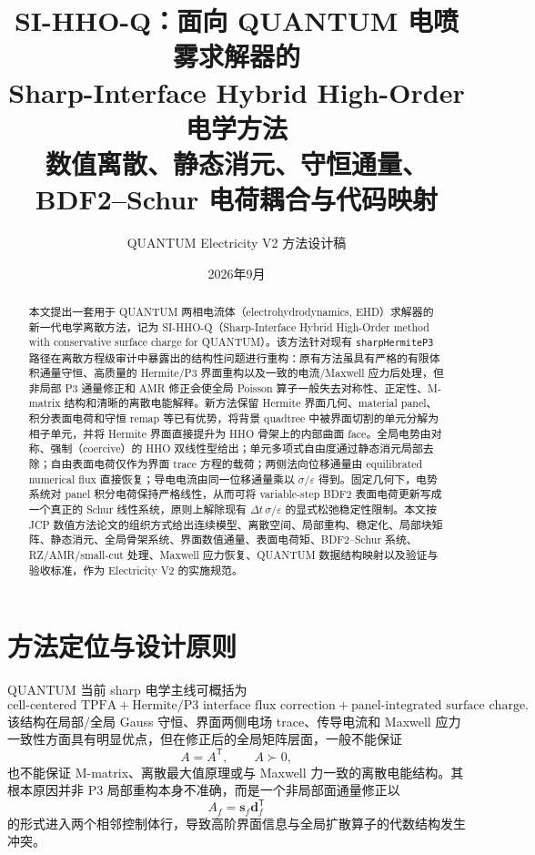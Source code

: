 \documentclass[UTF8,a4paper,11pt]{ctexart}
\title{\bfseries SI-HHO-Q：面向 QUANTUM 电喷雾求解器的\\Sharp-Interface Hybrid High-Order 电学方法\\\large 数值离散、静态消元、守恒通量、BDF2--Schur 电荷耦合与代码映射}
\author{QUANTUM Electricity V2 方法设计稿}
\date{2026年9月}
\newcommand{\eps}{\varepsilon}
\newcommand{\vct}[1]{\bm{#1}}
\newcommand{\T}{\mathsf{T}}
\begin{document}
\maketitle

\begin{abstract}
本文提出一套用于 QUANTUM 两相电流体（electrohydrodynamics, EHD）求解器的新一代电学离散方法，记为 SI-HHO-Q（Sharp-Interface Hybrid High-Order method with conservative surface charge for QUANTUM）。该方法针对现有 \texttt{sharpHermiteP3} 路径在离散方程级审计中暴露出的结构性问题进行重构：原有方法虽具有严格的有限体积通量守恒、高质量的 Hermite/P3 界面重构以及一致的电流/Maxwell 应力后处理，但非局部 P3 通量修正和 AMR 修正会使全局 Poisson 算子一般失去对称性、正定性、M-matrix 结构和清晰的离散电能解释。新方法保留 Hermite 界面几何、material panel、积分表面电荷和守恒 remap 等已有优势，将背景 quadtree 中被界面切割的单元分解为相子单元，并将 Hermite 界面直接提升为 HHO 骨架上的内部曲面 face。全局电势由对称、强制（coercive）的 HHO 双线性型给出；单元多项式自由度通过静态消元局部去除；自由表面电荷仅作为界面 trace 方程的载荷；两侧法向位移通量由 equilibrated numerical flux 直接恢复；导电电流由同一位移通量乘以 \(\sigma/\eps\) 得到。固定几何下，电势系统对 panel 积分电荷保持严格线性，从而可将 variable-step BDF2 表面电荷更新写成一个真正的 Schur 线性系统，原则上解除现有 \(\Delta t\,\sigma/\eps\) 的显式松弛稳定性限制。本文按 JCP 数值方法论文的组织方式给出连续模型、离散空间、局部重构、稳定化、局部块矩阵、静态消元、全局骨架系统、界面数值通量、表面电荷矩、BDF2--Schur 系统、RZ/AMR/small-cut 处理、Maxwell 应力恢复、QUANTUM 数据结构映射以及验证与验收标准，作为 Electricity V2 的实施规范。
\end{abstract}

\tableofcontents
\newpage

\section{方法定位与设计原则}

QUANTUM 当前 sharp 电学主线可概括为
\[
\text{cell-centered TPFA}
+\text{Hermite/P3 interface flux correction}
+\text{panel-integrated surface charge}.
\]
该结构在局部/全局 Gauss 守恒、界面两侧电场 trace、传导电流和 Maxwell 应力一致性方面具有明显优点，但在修正后的全局矩阵层面，一般不能保证
\[
A=A^{\T},\qquad A\succ0,
\]
也不能保证 M-matrix、离散最大值原理或与 Maxwell 力一致的离散电能结构。其根本原因并非 P3 局部重构本身不准确，而是一个非局部面通量修正以
\[
A_f=\vct{s}_f\vct{d}_f^{\T}
\]
的形式进入两个相邻控制体行，导致高阶界面信息与全局扩散算子的代数结构发生冲突。
\end{document}
